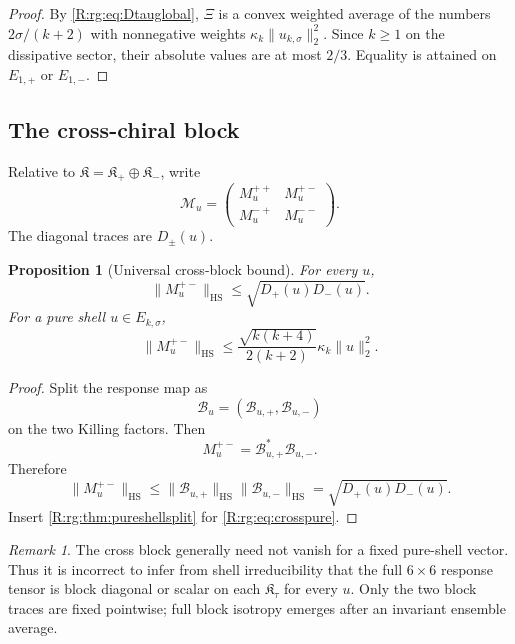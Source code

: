 \documentclass[
 aps,
 prd,
 reprint,
 amsmath,
 amssymb,
 nofootinbib,
 superscriptaddress
]{revtex4-2}
\newtheorem{proposition}[theorem]{Proposition}
\theoremstyle{definition}
\theoremstyle{remark}
\newtheorem{remark}[theorem]{Remark}
\newcommand{\cM}{\mathscr M}
\newcommand{\cB}{\mathscr B}
\newcommand{\HS}{\mathrm{HS}}
\begin{document}
\begin{proof}
By \eqref{R:rg:eq:Dtauglobal}, $\Xi$ is a convex weighted average of the numbers
$2\sigma/(k+2)$ with nonnegative weights
$\kappa_k\|u_{k,\sigma}\|_2^2$.  Since $k\ge1$ on the dissipative sector,
their absolute values are at most $2/3$.  Equality is attained on
$E_{1,+}$ or $E_{1,-}$.
\end{proof}

\subsection{The cross-chiral block}

Relative to
$\mathfrak K=\mathfrak K_+\oplus\mathfrak K_-$, write
\begin{equation}
 \cM_u
 =
 \begin{pmatrix}
 M^{++}_u & M^{+-}_u\\
 M^{-+}_u & M^{--}_u
 \end{pmatrix}.
 \label{R:rg:eq:blockM}
\end{equation}
The diagonal traces are $D_\pm(u)$.

\begin{proposition}[Universal cross-block bound]
\label{R:rg:prop:crossbound}
For every $u$,
\begin{equation}
 \boxed{
 \|M^{+-}_u\|_{\HS}
 \le
 \sqrt{D_+(u)D_-(u)}.
 }
 \label{R:rg:eq:crossbound}
\end{equation}
For a pure shell $u\in E_{k,\sigma}$,
\begin{equation}
 \|M^{+-}_u\|_{\HS}
 \le
 \frac{\sqrt{k(k+4)}}{2(k+2)}
 \kappa_k\|u\|_2^2.
 \label{R:rg:eq:crosspure}
\end{equation}
\end{proposition}

\begin{proof}
Split the response map as
\[
       \cB_u=(\cB_{u,+},\cB_{u,-})
\]
on the two Killing factors.  Then
\[
       M^{+-}_u=\cB_{u,+}^*\cB_{u,-}.
\]
Therefore
\[
 \|M^{+-}_u\|_{\HS}
 \le
 \|\cB_{u,+}\|_{\HS}
 \|\cB_{u,-}\|_{\HS}
 =
 \sqrt{D_+(u)D_-(u)}.
\]
Insert \cref{R:rg:thm:pureshellsplit} for \eqref{R:rg:eq:crosspure}.
\end{proof}

\begin{remark}
The cross block generally need not vanish for a fixed pure-shell vector.
Thus it is incorrect to infer from shell irreducibility that the full
$6\times6$ response tensor is block diagonal or scalar on each
$\mathfrak K_\tau$ for every $u$.  Only the two block traces are fixed
pointwise; full block isotropy emerges after an invariant ensemble average.
\end{remark}
\end{document}
